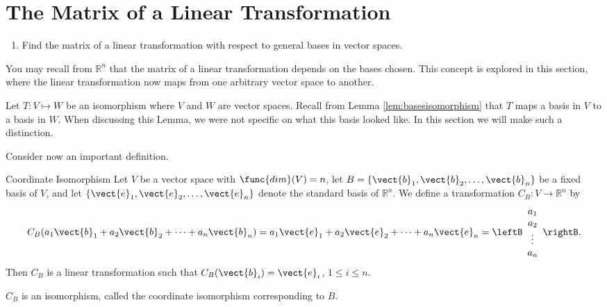 \section{The Matrix of a Linear Transformation}

\begin{outcome}

\begin{enumerate}

\item[A.] Find the matrix of a linear transformation with respect to general bases in vector spaces. 

\end{enumerate}
\end{outcome}

You may recall from $\mathbb{R}^n$ that the matrix of a linear transformation depends on the bases chosen. This concept is explored in this section, where the linear transformation now maps from one arbitrary vector space to another. 

Let $T: V \mapsto W$ be an isomorphism where $V$ and $W$ are vector spaces. Recall from Lemma \ref{lem:basesisomorphism} that $T$ maps a basis in $V$ to a basis in $W$. When discussing this Lemma, we were not specific on what this basis looked like. In this section we will make such a distinction. 

Consider now an important definition.

\begin{definition}{Coordinate Isomorphism}\label{def:coordinateisomorphism}
Let $V$ be a vector space with $\func{dim}(V)=n$, let $B=\{ \vect{b}_1, \vect{b}_2, \ldots, \vect{b}_n \}$ be a fixed basis of $V$,
and let $\{ \vect{e}_1, \vect{e}_2, \ldots, \vect{e}_n \}$
denote the standard basis of $\mathbb{R}^n$.
We define a transformation $C_B:V\to\mathbb{R}^n$ by
\[
C_B(a_1\vect{b}_1 + a_2\vect{b}_2 + \cdots + a_n\vect{b}_n)
=
a_1\vect{e}_1 + a_2\vect{e}_2 + \cdots + a_n\vect{e}_n
=
\leftB\begin{array}{c} a_1 \\ a_2 \\ \vdots \\ a_n
\end{array}\rightB.\]
Then $C_B$ is a linear transformation
such that
$C_B(\vect{b}_i)=\vect{e}_i$, $1\leq i\leq n$.

$C_B$ is an isomorphism, called
the coordinate isomorphism corresponding to $B$.
\end{definition}

